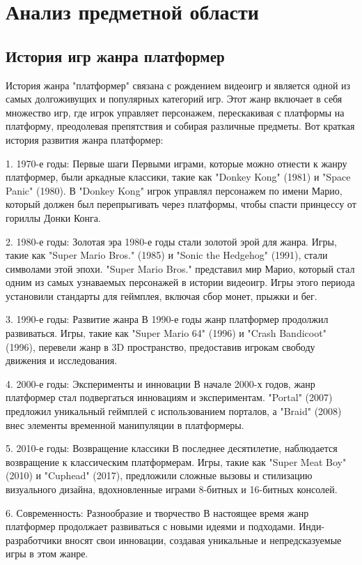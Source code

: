 \section{Анализ предметной области}
\subsection{История игр жанра платформер }
История жанра "платформер" связана с рождением видеоигр и является одной из самых долгоживущих и популярных категорий игр. Этот жанр включает в себя множество игр, где игрок управляет персонажем, перескакивая с платформы на платформу, преодолевая препятствия и собирая различные предметы. Вот краткая история развития жанра платформер:

1. 1970-е годы: Первые шаги\obeylines
Первыми играми, которые можно отнести к жанру платформер, были аркадные классики, такие как "Donkey Kong" (1981) и "Space Panic" (1980). В "Donkey Kong" игрок управлял персонажем по имени Марио, который должен был перепрыгивать через платформы, чтобы спасти принцессу от гориллы Донки Конга.

2. 1980-е годы: Золотая эра
1980-е годы стали золотой эрой для жанра. Игры, такие как "Super Mario Bros." (1985) и "Sonic the Hedgehog" (1991), стали символами этой эпохи. "Super Mario Bros." представил мир Марио, который стал одним из самых узнаваемых персонажей в истории видеоигр. Игры этого периода установили стандарты для геймплея, включая сбор монет, прыжки и бег.

3. 1990-е годы: Развитие жанра
В 1990-е годы жанр платформер продолжил развиваться. Игры, такие как "Super Mario 64" (1996) и "Crash Bandicoot" (1996), перевели жанр в 3D пространство, предоставив игрокам свободу движения и исследования.

4. 2000-е годы: Эксперименты и инновации
В начале 2000-х годов, жанр платформер стал подвергаться инновациям и экспериментам. "Portal" (2007) предложил уникальный геймплей с использованием порталов, а "Braid" (2008) внес элементы временной манипуляции в платформеры.

5. 2010-е годы: Возвращение классики
В последнее десятилетие, наблюдается возвращение к классическим платформерам. Игры, такие как "Super Meat Boy" (2010) и "Cuphead" (2017), предложили сложные вызовы и стилизацию визуального дизайна, вдохновленные играми 8-битных и 16-битных консолей.

6. Современность: Разнообразие и творчество
В настоящее время жанр платформер продолжает развиваться с новыми идеями и подходами. Инди-разработчики вносят свои инновации, создавая уникальные и непредсказуемые игры в этом жанре. 

